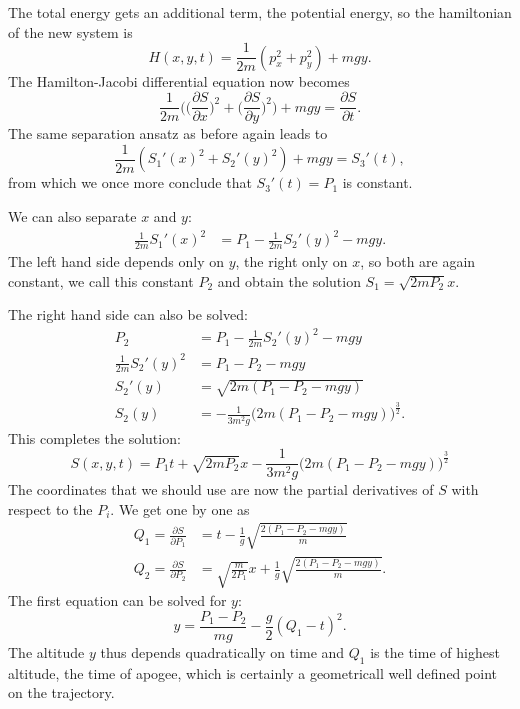 The total energy gets an additional term, the potential energy,
so the hamiltonian of the new system is
\[
H(x,y,t)=\frac1{2m}(p_x^2+p_y^2)+mgy.
\]
The Hamilton-Jacobi differential equation now becomes
\[
\frac1{2m}\biggl(
\biggl(\frac{\partial S}{\partial x}\biggr)^2
+
\biggl(\frac{\partial S}{\partial y}\biggr)^2
\biggr)
+mgy=\frac{\partial S}{\partial t}.
\]
The same separation ansatz as before again leads to
\[
\frac1{2m}(S_1'(x)^2+S_2'(y)^2)+mgy=S_3'(t),
\]
from which we once more conclude that $S_3'(t)=P_1$ is constant.

We can also separate $x$ and $y$:
\begin{align*}
\frac1{2m}S_1'(x)^2&=P_1-\frac1{2m}S_2'(y)^2-mgy.
\end{align*}
The left hand side depends only on $y$, the right only on $x$, so
both are again constant, we call this constant $P_2$ and obtain the solution
$S_1=\sqrt{2mP_2} x$.

The right hand side can also be solved:
\begin{align*}
P_2&=
P_1-\frac1{2m}S_2'(y)^2-mgy
\\
\frac1{2m}S_2'(y)^2
&=
P_1-P_2-mgy
\\
S_2'(y)&=\sqrt{
2m(P_1-P_2-mgy)
}
\\
S_2(y)
&=
-\frac1{3m^2g}\bigl(2m(P_1-P_2-mgy)\bigr)^{\frac32}.
\end{align*}
This completes the solution:
\[
S(x,y,t)=P_1t+\sqrt{2mP_2}x
-
\frac1{3m^2g}\bigl(2m(P_1-P_2-mgy)\bigr)^{\frac32}
\]
The coordinates that we should use are now the partial derivatives
of $S$ with respect to the $P_i$.
We get one by one as
\begin{equation}
\begin{aligned}
Q_1=\frac{\partial S}{\partial P_1}
&=
t-
\frac1{g}\sqrt{\frac{2(P_1-P_2-mgy)}{m}}
\\
Q_2=\frac{\partial S}{\partial P_2}
&=
\sqrt{\frac{m}{2P_1}}x
+
\frac1{g}\sqrt{\frac{2(P_1-P_2-mgy)}{m}}.
\end{aligned}
\label{jacobi:aufloesung}
\end{equation}
The first equation can be solved for $y$:
\begin{equation}
y=
\frac{P_1-P_2}{mg}-\frac{g}{2}(Q_1-t)^2.
\label{jacobi:quadratisch}
\end{equation}
The altitude $y$ thus depends quadratically on time and $Q_1$ is
the time of highest altitude, the time of apogee, which is certainly
a geometricall well defined point on the trajectory.


